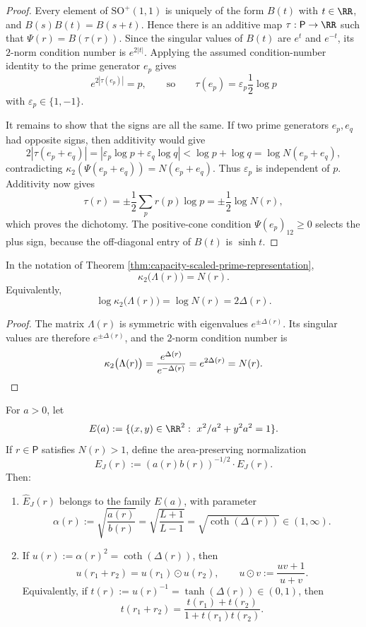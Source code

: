 \begin{proof}
Every element of \(\mathrm{SO}^+(1,1)\) is uniquely of the form \(B(t)\) with \(t\in\RR\), and \(B(s)B(t)=B(s+t)\). Hence there is an additive map \(\tau:\mathsf P\to\RR\) such that \(\Psi(r)=B(\tau(r))\). Since the singular values of \(B(t)\) are \(e^t\) and \(e^{-t}\), its \(2\)-norm condition number is \(e^{2|t|}\). Applying the assumed condition-number identity to the prime generator \(e_p\) gives
\[
e^{2|\tau(e_p)|}=p,
\qquad\text{so}\qquad
\tau(e_p)=\varepsilon_p\frac12\log p
\]
with \(\varepsilon_p\in\{1,-1\}\).

It remains to show that the signs are all the same. If two prime generators \(e_p,e_q\) had opposite signs, then additivity would give
\[
2|\tau(e_p+e_q)|=|\varepsilon_p\log p+\varepsilon_q\log q|<\log p+
\log q=\log N(e_p+e_q),
\]
contradicting \(\kappa_2(\Psi(e_p+e_q))=N(e_p+e_q)\). Thus \(\varepsilon_p\) is independent of \(p\). Additivity now gives
\[
\tau(r)=\pm\frac12\sum_p r(p)\log p=\pm\frac12\log N(r),
\]
which proves the dichotomy. The positive-cone condition \(\Psi(e_p)_{12}\ge0\) selects the plus sign, because the off-diagonal entry of \(B(t)\) is \(\sinh t\).
\end{proof}

\begin{corollary}\label{cor:capacity-condition-number-identity}
In the notation of Theorem \ref{thm:capacity-scaled-prime-representation},
\[
\kappa_2\bigl(\Lambda(r)\bigr)=N(r).
\]
Equivalently,
\[
\log\kappa_2\bigl(\Lambda(r)\bigr)=\log N(r)=2\Delta(r).
\]
\end{corollary}

\begin{proof}
The matrix \(\Lambda(r)\) is symmetric with eigenvalues \(e^{\pm\Delta(r)}\). Its singular values are therefore \(e^{\pm\Delta(r)}\), and the \(2\)-norm condition number is
\[
\kappa_2\bigl(\Lambda(r)\bigr)=\frac{e^{\Delta(r)}}{e^{-\Delta(r)}}=e^{2\Delta(r)}=N(r).
\qedhere
\]
\end{proof}

\begin{theorem}\label{thm:joukowsky-area-preserving-cayley}
For \(a>0\), let
\[
E(a):=\{(x,y)\in\RR^2:\ x^2/a^2+y^2a^2=1\}.
\]
If \(r\in\mathsf P\) satisfies \(N(r)>1\), define the area-preserving normalization
\[
\widehat E_J(r):=(a(r)b(r))^{-1/2}\cdot E_J(r).
\]
Then:
\begin{enumerate}
  \item \(\widehat E_J(r)\) belongs to the family \(E(a)\), with parameter
  \[
  \alpha(r):=\sqrt{\frac{a(r)}{b(r)}}
  =\sqrt{\frac{L+1}{L-1}}
  =\sqrt{\coth(\Delta(r))}\in(1,\infty).
  \]

  \item If \(u(r):=\alpha(r)^2=\coth(\Delta(r))\), then
  \[
  u(r_1+r_2)=u(r_1)\odot u(r_2),
  \qquad
  u\odot v:=\frac{uv+1}{u+v}.
  \]
  Equivalently, if \(t(r):=u(r)^{-1}=\tanh(\Delta(r))\in(0,1)\), then
  \[
  t(r_1+r_2)=\frac{t(r_1)+t(r_2)}{1+t(r_1)t(r_2)}.
  \]
\end{enumerate}
\end{theorem}

